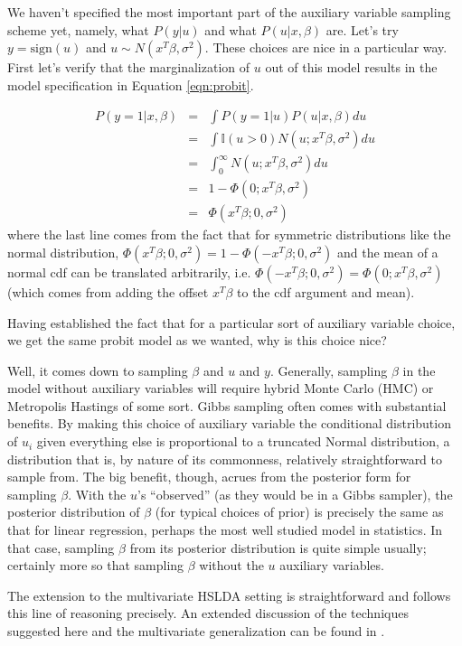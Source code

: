 We haven't specified the most important part of the auxiliary variable sampling scheme yet, namely, what $P(y|u)$ and what $P(u|x,\beta)$ are.   Let's try $y = \mbox{sign}(u)$ and $u \sim N(x^T\beta,\sigma^2).$  These choices are nice in a particular way.  First let's verify that the marginalization of $u$ out of this model results in the model specification in Equation \ref{eqn:probit}.

\begin{eqnarray*}
P(y=1|x,\beta) &=&  \int P(y=1|u)P(u|x,\beta)du\\
&=& \int \mathbb{I}(u>0)N(u;x^T\beta,\sigma^2) du \\
&=& \int_0^\infty N(u;x^T\beta,\sigma^2) du \\
&=& 1 - \Phi(0; x^T\beta,\sigma^2) \\ 
&=& \Phi(x^T\beta; 0, \sigma^2)
\end{eqnarray*}
where the last line comes from the fact that for symmetric distributions like the normal distribution, 
$\Phi(x^T\beta; 0, \sigma^2) = 1 - \Phi(-x^T\beta; 0, \sigma^2)$ and the mean of a normal cdf can be translated arbitrarily, i.e. $\Phi(-x^T\beta; 0, \sigma^2) = \Phi(0;x^T\beta, \sigma^2)$ (which comes from adding the offset $x^T\beta$ to the cdf argument and mean).  

Having established the fact that for a particular sort of auxiliary variable choice, we get the same probit model as we wanted, why is this choice nice?

Well, it comes down to sampling $\beta$ and $u$ and $y$.  Generally, sampling $\beta$ in the model without auxiliary variables will require hybrid Monte Carlo (HMC) or Metropolis Hastings of some sort.  Gibbs sampling often comes with substantial benefits.  By making this choice of auxiliary variable the conditional distribution of $u_i$ given everything else is proportional to a truncated Normal distribution, a distribution that is, by nature of its commonness, relatively straightforward to sample from.  The big benefit, though, acrues from the posterior form for sampling $\beta$.  With the $u$'s ``observed'' (as they would be in a Gibbs sampler), the posterior distribution of $\beta$ (for typical choices of prior) is precisely the same as that for linear regression, perhaps the most well studied model in statistics.  In that case, sampling $\beta$ from its posterior distribution is quite simple usually; certainly more so that sampling $\beta$ without the $u$ auxiliary variables.

The extension to the multivariate HSLDA setting is straightforward and follows this line of reasoning precisely.  An extended discussion of the techniques suggested here and the multivariate generalization can be found in \cite{gelmanbda04}.


